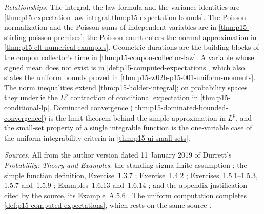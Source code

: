 \emph{Relationships.} The integral, the law formula and the variance
identities are \cref{thm:p15-expectation-law-integral,thm:p15-expectation-bounds}.
The Poisson normalization and the Poisson sums of independent
variables are in \cref{thm:p15-stirling-poisson-premises}; the
Poisson count enters the normal approximation in
\cref{thm:p15-clt-numerical-examples}. Geometric durations are the
building blocks of the coupon collector's time in
\cref{thm:p15-coupon-collector-law}. A variable whose signed mean
does not exist is in \cref{def:p15-computed-expectations}, which also
states the uniform bounds proved in
\cref{thm:p15-w02b-p15-001-uniform-moments}. The norm inequalities
extend \cref{thm:p15-holder-integral}; on probability spaces they
underlie the \(L^p\) contraction of conditional expectation in
\cref{thm:p15-conditional-lp}. Dominated convergence
(\cref{thm:p15-dominated-bounded-convergence}) is the limit theorem
behind the simple approximation in \(L^p\), and the small-set property
of a single integrable function is the one-variable case of the
uniform integrability criteria in \cref{thm:p15-ui-small-sets}.

\emph{Sources.} All from the author version dated 11 January 2019 of
Durrett's \emph{Probability: Theory and Examples}: the standing
sigma-finite assumption \cite[p.~18]{DurrettPTEAuthor2019}; the simple
function definition, Exercise~1.3.7 \cite[p.~17]{DurrettPTEAuthor2019};
Exercise~1.4.2 \cite[p.~24]{DurrettPTEAuthor2019};
Exercises~1.5.1--1.5.3, 1.5.7 and~1.5.9
\cite[p.~28]{DurrettPTEAuthor2019}; Examples~1.6.13 and~1.6.14
\cite[pp.~34--35]{DurrettPTEAuthor2019}; and the appendix
justification cited by the source, its Example~A.5.6
\cite[pp.~472--473]{DurrettPTEAuthor2019}. The uniform computation
completes \cref{def:p15-computed-expectations}, which rests on the
same source \cite[pp.~18--37]{DurrettPTEAuthor2019}.
